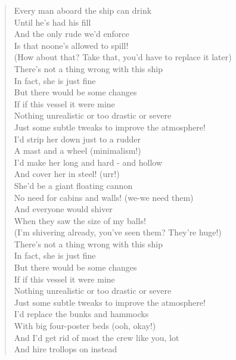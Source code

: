\documentclass[11pt]{article}
\begin{document}
\begin{verse}
Every man aboard the ship can drink\\
Until he's had his fill\\
And the only rude we'd enforce\\
Is that noone's allowed to spill!\\
(How about that? Take that, you'd have to replace it later)\\
\vspace*{1em}
There's not a thing wrong with this ship\\
In fact, she is just fine\\
But there would be some changes\\
If if this vessel it were mine\\
Nothing unrealistic or too drastic or severe\\
Just some subtle tweaks to improve the atmosphere!\\
\vspace*{1em}
I'd strip her down just to a rudder\\
A mast and a wheel (minimalism!)\\
I'd make her long and hard - and hollow\\
And cover her in steel! (urr!)\\
She'd be a giant floating cannon\\
No need for cabins and walls! (we-we need them)\\
And everyone would shiver\\
When they saw the size of my balls!\\
(I'm shivering already, you've seen them? They're huge!)\\
\vspace*{1em}
There's not a thing wrong with this ship\\
In fact, she is just fine\\
But there would be some changes\\
If if this vessel it were mine\\
Nothing unrealistic or too drastic or severe\\
Just some subtle tweaks to improve the atmosphere!\\
\vspace*{1em}
I'd replace the bunks and hammocks\\
With big four-poster beds (ooh, okay!)\\
And I'd get rid of most the crew like you, lot\\
And hire trollops on instead\\

\end{verse}
\end{document}
